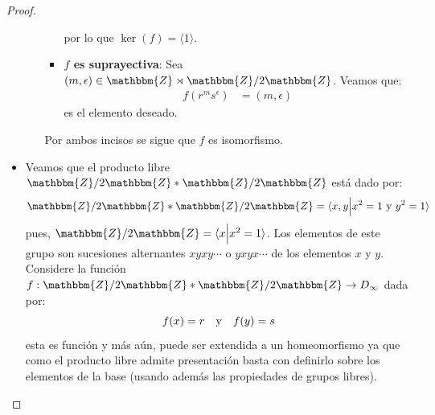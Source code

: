 \documentclass[12pt]{report}
\newcounter{it}
\theoremstyle{largebreak}
\newcommand\cf[3]{\ensuremath{#1:#2\rightarrow#3}}
\newcommand{\bbm}[1]{\ensuremath{\mathbbm{#1}}}
\newcommand{\gen}[1]{\ensuremath{\langle#1\rangle}}
\begin{document}
\begin{proof}
\begin{itemize}
\begin{itemize}
\begin{itemize}
                    por lo que $\ker(f)=\gen{1}$.
                    \item \textbf{$f$ es suprayectiva}: Sea $(m,\epsilon)\in\bbm{Z}\rtimes\bbm{Z}/2\bbm{Z}$. Veamos que:
                    \begin{equation*}
                        \begin{split}
                            f(r^ms^{\epsilon})&=(m,\epsilon)
                        \end{split}
                    \end{equation*}
                    es el elemento deseado.
                \end{itemize}
                Por ambos incisos se sigue que $f$ es isomorfismo.
            \end{itemize}
            \item Veamos que el producto libre $\bbm{Z}/2\bbm{Z}*\bbm{Z}/2\bbm{Z}$ está dado por:
            \begin{equation*}
                \bbm{Z}/2\bbm{Z}*\bbm{Z}/2\bbm{Z}=\gen{x,y\Big|x^2=1\textup{ y }y^2=1}
            \end{equation*}
            pues, $\bbm{Z}/2\bbm{Z}=\gen{x\Big|x^2=1}$. Los elementos de este grupo son sucesiones alternantes $xyxy\cdots$ o $yxyx\cdots$ de los elementos $x$ y $y$. Considere la función $\cf{f}{\bbm{Z}/2\bbm{Z}*\bbm{Z}/2\bbm{Z}}{D_\infty}$ dada por:
            \begin{equation*}
                f(x)=r\quad\textup{y}\quad f(y)=s
            \end{equation*}
            esta es función y más aún, puede ser extendida a un homeomorfismo ya que como el producto libre admite presentación basta con definirlo sobre los elementos de la base (usando además las propiedades de grupos libres).


\end{itemize}
\end{proof}
\end{document}
